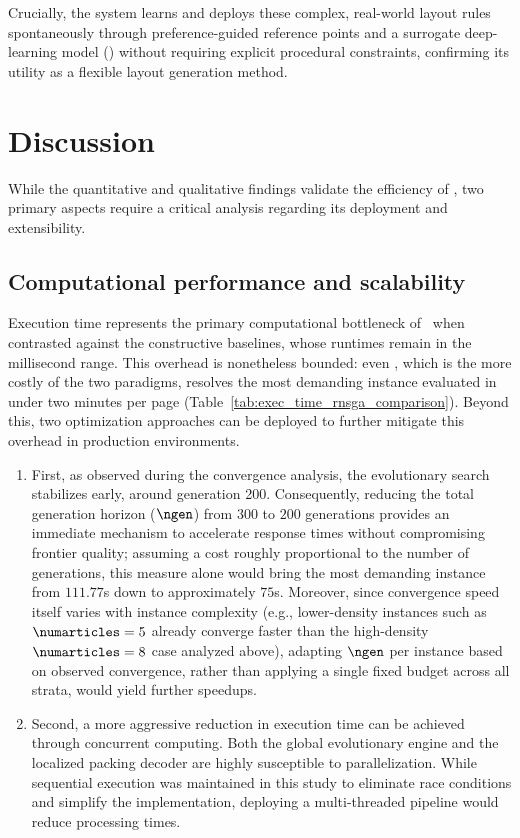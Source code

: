 Crucially, the system learns and deploys these complex, real-world layout rules spontaneously through preference-guided reference points and a surrogate deep-learning model (\neuralmethod) without requiring explicit procedural constraints, confirming its utility as a flexible layout generation method.

\section{Discussion}
\label{sec:pagegen-discussion}

While the quantitative and qualitative findings validate the efficiency of \methodNameGeneral, two primary aspects require a critical analysis regarding its deployment and extensibility.

\subsection*{Computational performance and scalability}
\label{sec:computational-performance}
Execution time represents the primary computational bottleneck of \methodNameGeneral\ when contrasted against the constructive baselines, whose runtimes remain in the millisecond range. This overhead is nonetheless bounded: even \methodName, which is the more costly of the two paradigms, resolves the most demanding instance evaluated in under two minutes per page (Table~\ref{tab:exec_time_rnsga_comparison}). 
Beyond this, two optimization approaches can be deployed to further mitigate this overhead in production environments. 
\begin{enumerate}
  \item First, as observed during the convergence analysis, the evolutionary search stabilizes early, around generation 200. Consequently, reducing the total generation horizon ($\ngen$) from $300$ to $200$ generations provides an immediate mechanism to accelerate response times without compromising frontier quality; assuming a cost roughly proportional to the number of generations, this measure alone would bring the most demanding instance from $111.77$s down to approximately $75$s. 
  Moreover, since convergence speed itself varies with instance complexity (e.g., lower-density instances such as $\numarticles=5$ already converge faster than the high-density $\numarticles=8$ case analyzed above), adapting $\ngen$ per instance based on observed convergence, rather than applying a single fixed budget across all strata, would yield further speedups.

  \item Second, a more aggressive reduction in execution time can be achieved through concurrent computing. Both the global evolutionary engine and the localized packing decoder are highly susceptible to parallelization. While sequential execution was maintained in this study to eliminate race conditions and simplify the implementation, deploying a multi-threaded pipeline would reduce processing times. 
\end{enumerate}
